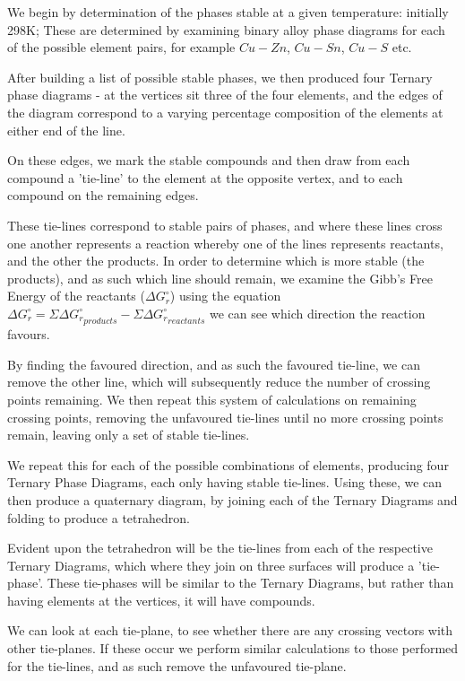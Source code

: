 We begin by determination of the phases stable at a given temperature: initially 298K; These are determined by examining binary alloy phase diagrams for each of the possible element pairs, for example $Cu-Zn$, $Cu-Sn$, $Cu-S$ etc. 

After building a list of possible stable phases, we then produced four Ternary phase diagrams - at the vertices sit three of the four elements, and the edges of the diagram correspond to a varying percentage composition of the elements at either end of the line. 

On these edges, we mark the stable compounds and then draw from each compound a 'tie-line' to the element at the opposite vertex, and to each compound on the remaining edges. 

These tie-lines correspond to stable pairs of phases, and where these lines cross one another represents a reaction whereby one of the lines represents reactants, and the other the products. In order to determine which is more stable (the products), and as such which line should remain, we examine the Gibb's Free Energy of the reactants ($\Delta G_{r}^{\circ}$)\citep{perrot_z_1998} using the equation $\Delta G_{r}^{\circ} = \Sigma\Delta {G_{r}^{\circ}}_{products} - \Sigma\Delta {G_{r}^{\circ}}_{reactants}$ we can see which direction the reaction favours.

By finding the favoured direction, and as such the favoured tie-line, we can remove the other line, which will subsequently reduce the number of crossing points remaining. We then repeat this system of calculations on remaining crossing points, removing the unfavoured tie-lines until no more crossing points remain, leaving only a set of stable tie-lines.

We repeat this for each of the possible combinations of elements, producing four Ternary Phase Diagrams, each only having stable tie-lines. Using these, we can then produce a quaternary diagram, by joining each of the Ternary Diagrams and folding to produce a tetrahedron. 

Evident upon the tetrahedron will be the tie-lines from each of the respective Ternary Diagrams, which where they join on three surfaces will produce a 'tie-phase'. These tie-phases will be similar to the Ternary Diagrams, but rather than having elements at the vertices, it will have compounds.

We can look at each tie-plane, to see whether there are any crossing vectors with other tie-planes. If these occur we perform similar calculations to those performed for the tie-lines, and as such remove the unfavoured tie-plane.

